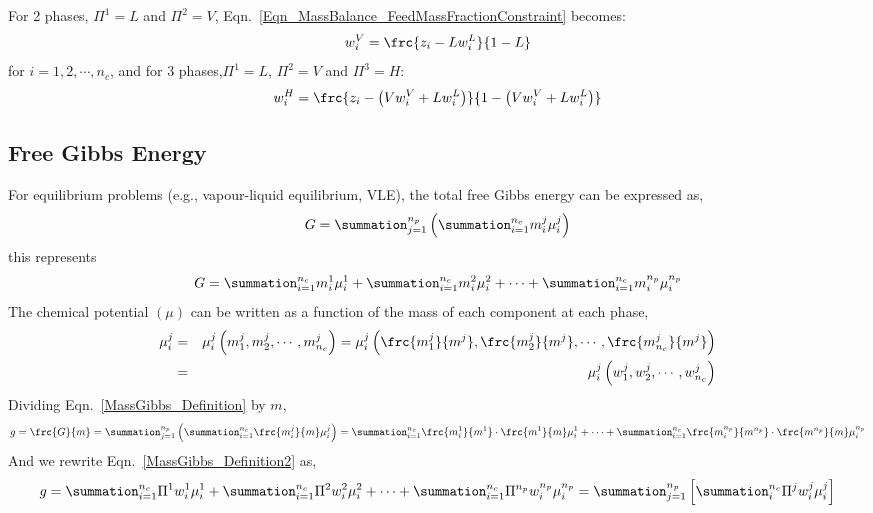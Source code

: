 \begin{mdframed}[style=JFrame]
For 2 phases, $\Pi^{1}=L$ and $\Pi^{2}=V$, Eqn.~\ref{Eqn_MassBalance_FeedMassFractionConstraint} becomes:
\begin{displaymath}
w_{i}^{V} = \frc{z_{i}-Lw_{i}^{L}}{1-L}
\end{displaymath}
for $i=1,2,\cdots,n_{c}$, and for 3 phases,$\Pi^{1}=L$, $\Pi^{2}=V$ and $\Pi^{3}=H$:
\begin{displaymath}
w_{i}^{H} = \frc{z_{i}-\left(V w_{i}^{V} + L w_{i}^{L}\right)}{1 - \left(V w_{i}^{V} + L w_{i}^{L}\right)}
\end{displaymath}
\end{mdframed}

\subsection{Free Gibbs Energy}
For equilibrium problems (e.g., vapour-liquid equilibrium, VLE), the total free Gibbs energy can be expressed as,
\begin{equation}
G = \summation_{j=1}^{n_{p}}\left(\summation_{i=1}^{n_{c}} m_{i}^{j}\mu_{i}^{j}\right)
\label{MassGibbs_Definition}
\end{equation} 
this represents
\begin{displaymath}
G = \summation_{i=1}^{n_{c}} m_{i}^{1}\mu_{i}^{1} + \summation_{i=1}^{n_{c}} m_{i}^{2}\mu_{i}^{2} + \cdots + \summation_{i=1}^{n_{c}} m_{i}^{n_{p}}\mu_{i}^{n_{p}}
\end{displaymath}
The chemical potential $\left(\mu\right)$ can be written as a function of the mass of each component at each phase,
\begin{eqnarray}
\mu_{i}^{j} &=& \mu_{i}^{j}\left(m_{1}^{j}, m_{2}^{j}, \cdots, m_{n_{c}}^{j}\right) = \mu_{i}^{j}\left(\frc{m_{1}^{j}}{m^{j}}, \frc{m_{2}^{j}}{m^{j}}, \cdots, \frc{m_{n_{c}}^{j}}{m^{j}}\right)\nonumber \\
 &=& \mu_{i}^{j}\left(w_{1}^{j}, w_{2}^{j}, \cdots, w_{n_{c}}^{j}\right)\label{chempotential_functional}
\end{eqnarray}
Dividing Eqn.~\ref{MassGibbs_Definition} by $m$,
\begin{equation}
g = \frc{G}{m} = \summation_{j=1}^{n_{p}}\left(\summation_{i=1}^{n_{c}}\frc{m_{i}^{j}}{m}\mu_{i}^{j}\right) = \summation_{i=1}^{n_{c}}\frc{m_{i}^{1}}{m^{1}} \cdot \frc{m^{1}}{m} \mu_{i}^{1} + \cdots + \summation_{i=1}^{n_{c}}\frc{m_{i}^{n_{p}}}{m^{n_{p}}} \cdot \frc{m^{n_{p}}}{m} \mu_{i}^{n_{p}}
\label{MassGibbs_Definition2}
\end{equation}
And we rewrite Eqn.~\ref{MassGibbs_Definition2} as,
\begin{equation}
g = \summation_{i=1}^{n_{c}}\Pi^{1}w_{i}^{1}\mu_{i}^{1} + \summation_{i=1}^{n_{c}}\Pi^{2}w_{i}^{2}\mu_{i}^{2} + \cdots + \summation_{i=1}^{n_{c}}\Pi^{n_{p}}w_{i}^{n_{p}}\mu_{i}^{n_{p}} = \summation_{j=1}^{n_{p}}\left[\summation_{i}^{n_{c}}\Pi^{j}w_{i}^{j}\mu_{i}^{j}\right] \label{MassGibbs_Definition3}
\end{equation}


